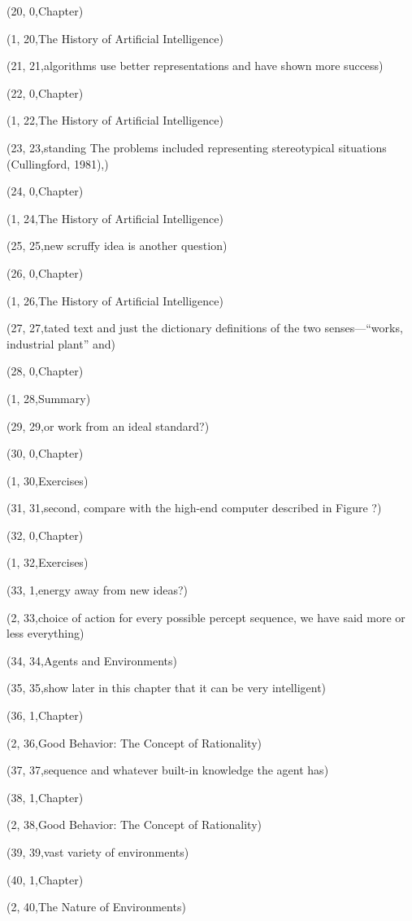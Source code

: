 (20, 0,Chapter)

(1, 20,The History of Artiﬁcial Intelligence)

(21, 21,algorithms use better representations and have shown more success)

(22, 0,Chapter)

(1, 22,The History of Artiﬁcial Intelligence)

(23, 23,standing The problems included representing stereotypical situations (Cullingford, 1981),)

(24, 0,Chapter)

(1, 24,The History of Artiﬁcial Intelligence)

(25, 25,new scruffy idea is another question)

(26, 0,Chapter)

(1, 26,The History of Artiﬁcial Intelligence)

(27, 27,tated text and just the dictionary deﬁnitions of the two senses—“works, industrial plant” and)

(28, 0,Chapter)

(1, 28,Summary)

(29, 29,or work from an ideal standard?)

(30, 0,Chapter)

(1, 30,Exercises)

(31, 31,second, compare with the high-end computer described in Figure ?)

(32, 0,Chapter)

(1, 32,Exercises)

(33, 1,energy away from new ideas?)

(2, 33,choice of action for every possible percept sequence, we have said more or less everything)

(34, 34,Agents and Environments)

(35, 35,show later in this chapter that it can be very intelligent)

(36, 1,Chapter)

(2, 36,Good Behavior: The Concept of Rationality)

(37, 37,sequence and whatever built-in knowledge the agent has)

(38, 1,Chapter)

(2, 38,Good Behavior: The Concept of Rationality)

(39, 39,vast variety of environments)

(40, 1,Chapter)

(2, 40,The Nature of Environments)

